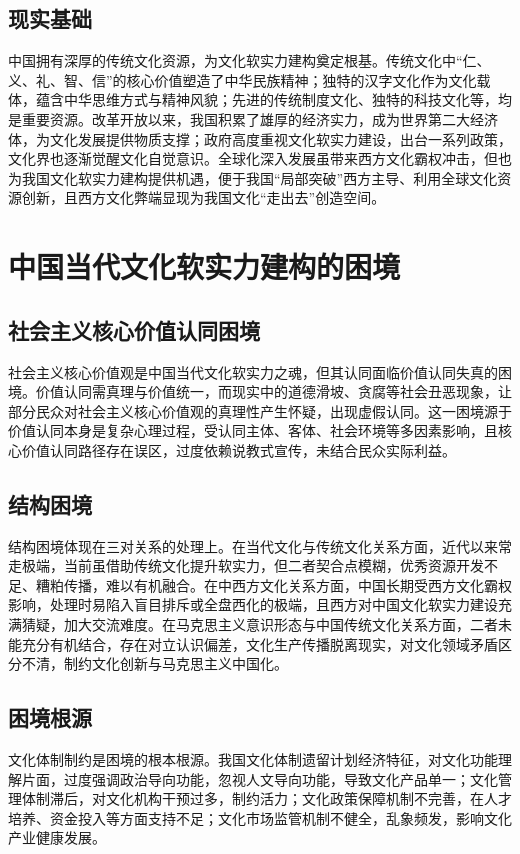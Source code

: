 \documentclass{article}
\begin{document}
\subsection{现实基础}
中国拥有深厚的传统文化资源，为文化软实力建构奠定根基。传统文化中“仁、义、礼、智、信”的核心价值塑造了中华民族精神；独特的汉字文化作为文化载体，蕴含中华思维方式与精神风貌；先进的传统制度文化、独特的科技文化等，均是重要资源。改革开放以来，我国积累了雄厚的经济实力，成为世界第二大经济体，为文化发展提供物质支撑；政府高度重视文化软实力建设，出台一系列政策，文化界也逐渐觉醒文化自觉意识。全球化深入发展虽带来西方文化霸权冲击，但也为我国文化软实力建构提供机遇，便于我国“局部突破”西方主导、利用全球文化资源创新，且西方文化弊端显现为我国文化“走出去”创造空间。

\section{中国当代文化软实力建构的困境}
\subsection{社会主义核心价值认同困境}
社会主义核心价值观是中国当代文化软实力之魂，但其认同面临价值认同失真的困境。价值认同需真理与价值统一，而现实中的道德滑坡、贪腐等社会丑恶现象，让部分民众对社会主义核心价值观的真理性产生怀疑，出现虚假认同。这一困境源于价值认同本身是复杂心理过程，受认同主体、客体、社会环境等多因素影响，且核心价值认同路径存在误区，过度依赖说教式宣传，未结合民众实际利益。

\subsection{结构困境}
结构困境体现在三对关系的处理上。在当代文化与传统文化关系方面，近代以来常走极端，当前虽借助传统文化提升软实力，但二者契合点模糊，优秀资源开发不足、糟粕传播，难以有机融合。在中西方文化关系方面，中国长期受西方文化霸权影响，处理时易陷入盲目排斥或全盘西化的极端，且西方对中国文化软实力建设充满猜疑，加大交流难度。在马克思主义意识形态与中国传统文化关系方面，二者未能充分有机结合，存在对立认识偏差，文化生产传播脱离现实，对文化领域矛盾区分不清，制约文化创新与马克思主义中国化。

\subsection{困境根源}
文化体制制约是困境的根本根源。我国文化体制遗留计划经济特征，对文化功能理解片面，过度强调政治导向功能，忽视人文导向功能，导致文化产品单一；文化管理体制滞后，对文化机构干预过多，制约活力；文化政策保障机制不完善，在人才培养、资金投入等方面支持不足；文化市场监管机制不健全，乱象频发，影响文化产业健康发展。
\end{document}
